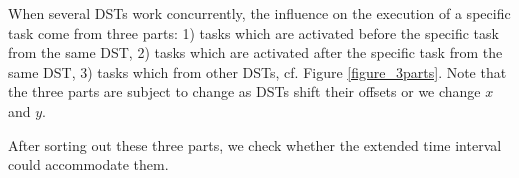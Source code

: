 \documentclass[sigconf]{acmart}
\begin{document}
When several DSTs work concurrently, the influence on the execution of a specific task come from three parts: 1) tasks which are activated before the specific task from the same DST, 2) tasks which are activated after the specific task from the same DST, 3) tasks which from other DSTs, cf. Figure \ref{figure_3parts}. Note that the three parts are subject to change as DSTs shift their offsets or we change $x$ and $y$.

After sorting out these three parts, we check whether the extended time interval could accommodate them. 


\end{document}
